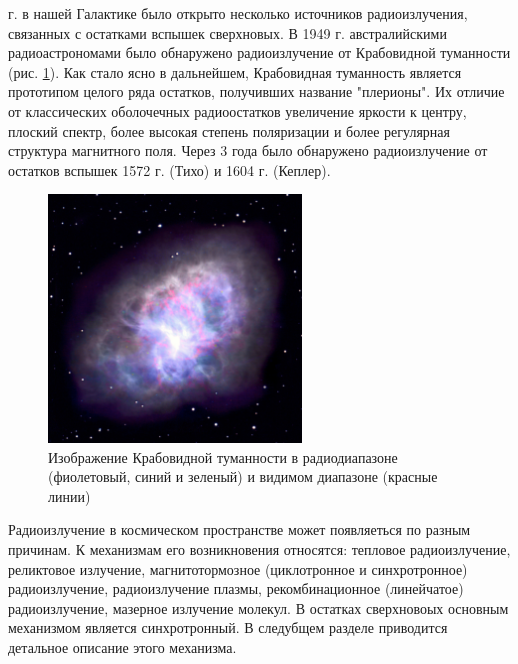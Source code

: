 \documentclass[a4paper,12pt]{extarticle}
\begin{document}
 г. в нашей Галактике было открыто несколько источников радиоизлучения, связанных с остатками вспышек сверхновых. В 1949 г. австралийскими радиоастрономами было обнаружено радиоизлучение от Крабовидной туманности (рис. \ref{fig:Сrab Nebula Rafio Optic}). Как стало ясно в дальнейшем, Крабовидная туманность является прототипом целого ряда остатков, получивших название "плерионы". Их отличие от классических оболочечных радиоостатков увеличение яркости к центру, плоский спектр, более высокая степень поляризации и более регулярная структура магнитного поля. 
Через 3 года было обнаружено радиоизлучение от остатков вспышек 1572 г. (Тихо)  и 1604 г. (Кеплер). 

\begin{figure}[!htb] 
	\centering
	\includegraphics[width=0.6\textwidth]{M1TB2flat_large_Radio_Optic.jpg}
	\caption{
		Изображение Крабовидной туманности в радиодиапазоне (фиолетовый, синий и зеленый) и видимом диапазоне (красные линии) 
	}
	\label{fig:Сrab Nebula Rafio Optic}
\end{figure}


Радиоизлучение в космическом пространстве может появляеться по разным причинам.
К механизмам его возникновения относятся: тепловое радиоизлучение, реликтовое излучение, магнитотормозное (циклотронное и синхротронное) радиоизлучение, радиоизлучение плазмы, рекомбинационное (линейчатое) радиоизлучение, мазерное излучение молекул. \cite{Kaplan1966}
В остатках сверхновоых основным механизмом является синхротронный. В следубщем разделе приводится детальное описание этого механизма.
\end{document}
